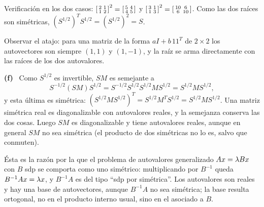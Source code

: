 \documentclass[11pt,a4paper]{article}
\newcommand{\bi}[1]{\boldsymbol{#1}}
\newcommand{\n}[1]{\boldsymbol{#1}}
\DeclareMathOperator{\gen}{span}
\DeclareMathOperator{\tr}{tr}
\DeclareMathOperator{\rg}{rg}
\def\n#1{#1}\def\bi#1{#1}\def\rg{rg}\def\tr{tr}\def\gen{span}%
\newcommand{\itemsol}[1]{\par\medskip\noindent\textbf{(#1)}\ \ignorespaces}
\begin{document}
Verificación en los dos casos:
$\begin{bsmallmatrix}2&1\\1&2\end{bsmallmatrix}^2
=\begin{bsmallmatrix}5&4\\4&5\end{bsmallmatrix}$ y
$\begin{bsmallmatrix}3&1\\1&3\end{bsmallmatrix}^2
=\begin{bsmallmatrix}10&6\\6&10\end{bsmallmatrix}$. Como las dos raíces son
simétricas, $(S^{1/2})^TS^{1/2}=(S^{1/2})^2=S$.

Observar el atajo: para una matriz de la forma $aI+b\,\n1\n1^T$ de $2\times2$ los
autovectores son siempre $(1,1)$ y $(1,-1)$, y la raíz se arma directamente con
las raíces de los dos autovalores.

\itemsol{f} Como $S^{1/2}$ es invertible, $SM$ es semejante a
\[
S^{-1/2}(SM)S^{1/2}=S^{-1/2}S^{1/2}S^{1/2}MS^{1/2}=S^{1/2}MS^{1/2},
\]
y esta última es simétrica:
$(S^{1/2}MS^{1/2})^T=S^{1/2}M^TS^{1/2}=S^{1/2}MS^{1/2}$. Una matriz simétrica
real es diagonalizable con autovalores reales, y la semejanza conserva las dos
cosas. Luego $SM$ es diagonalizable y tiene autovalores reales, aunque en general
$SM$ no sea simétrica (el producto de dos simétricas no lo es, salvo que
conmuten).

Ésta es la razón por la que el problema de autovalores generalizado
$A\bx=\lambda B\bx$ con $B$ sdp se comporta como uno simétrico: multiplicando por
$B^{-1}$ queda $B^{-1}A\bx=\lambda\bx$, y $B^{-1}A$ es del tipo ``sdp por
simétrica''. Los autovalores son reales y hay una base de autovectores, aunque
$B^{-1}A$ no sea simétrica; la base resulta ortogonal, no en el producto interno
usual, sino en el asociado a $B$.
\end{document}
